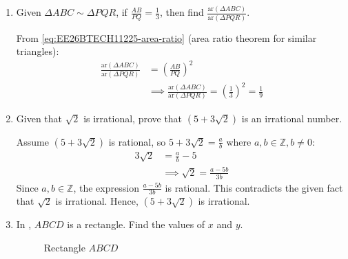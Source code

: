 \begin{enumerate}[label=\thesubsection.\arabic*, ref=\thesubsection.\theenumi]
\solution From \eqref{eq:EE26BTECH11225-complementary}, $\cos(90^\circ - \theta) = \sin \theta$:
\begin{align}
    \cos 67^\circ &= \cos(90^\circ - 23^\circ) \\
    &\implies \cos 67^\circ = \sin 23^\circ \\
    &\implies \cos^2 67^\circ - \sin^2 23^\circ = \sin^2 23^\circ - \sin^2 23^\circ = 0
\end{align}
    \item Given $\Delta ABC \sim \Delta PQR$, if $\frac{AB}{PQ} = \frac{1}{3}$, then find $\frac{\text{ar}(\Delta ABC)}{\text{ar}(\Delta PQR)}$.

\solution From \eqref{eq:EE26BTECH11225-area-ratio} (area ratio theorem for similar triangles):
\begin{align}
    \frac{\text{ar}(\Delta ABC)}{\text{ar}(\Delta PQR)} &= \left(\frac{AB}{PQ}\right)^2 \\
    &\implies \frac{\text{ar}(\Delta ABC)}{\text{ar}(\Delta PQR)} = \left(\frac{1}{3}\right)^2 = \frac{1}{9}
\end{align}
    \item Given that $\sqrt{2}$ is irrational, prove that $(5+3\sqrt{2})$ is an irrational number.

\solution Assume $(5+3\sqrt{2})$ is rational, so $5+3\sqrt{2} = \frac{a}{b}$ where $a, b \in \mathbb{Z}, b \neq 0$:
\begin{align}
    3\sqrt{2} &= \frac{a}{b} - 5 \\
    &\implies \sqrt{2} = \frac{a - 5b}{3b}
\end{align}
Since $a, b \in \mathbb{Z}$, the expression $\frac{a - 5b}{3b}$ is rational. This contradicts the given fact that $\sqrt{2}$ is irrational. Hence, $(5+3\sqrt{2})$ is irrational.

    \item In , $ABCD$ is a rectangle. Find the values of $x$ and $y$.
    \begin{figure}[H]
\centering

\caption{Rectangle $ABCD$}
\label{fig:rectangle_q8}
\end{figure} 


\end{enumerate}
